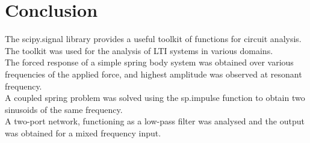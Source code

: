 \documentclass{article}
\begin{document}
\section{Conclusion}
The scipy.signal library provides a useful toolkit of functions for circuit analysis. The toolkit was used for the analysis of LTI systems in various domains.\\
The forced response of a simple spring body system was obtained over various frequencies of the applied force, and highest amplitude was observed at resonant frequency.\\
A coupled spring problem was solved using the sp.impulse function to obtain two sinusoids of the same frequency.\\
A two-port network, functioning as a low-pass filter was analysed and the output was obtained for a mixed frequency input.
\end{document}

